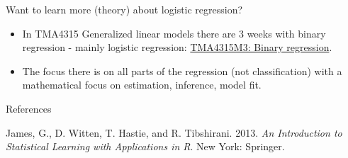 \documentclass[10pt,ignorenonframetext,]{beamer}
\begin{document}
\begin{frame}

\begin{block}{Want to learn more (theory) about logistic regression?}

\begin{itemize}
\item
  In TMA4315 Generalized linear models there are 3 weeks with binary
  regression - mainly logistic regression:
  \href{https://www.math.ntnu.no/emner/TMA4315/2018h/3BinReg.html}{TMA4315M3:
  Binary regression}.
\item
  The focus there is on all parts of the regression (not classification)
  with a mathematical focus on estimation, inference, model fit.
\end{itemize}

\end{block}

\end{frame}

\begin{frame}{References}

\hypertarget{refs}{}
\hypertarget{ref-james.etal}{}
James, G., D. Witten, T. Hastie, and R. Tibshirani. 2013. \emph{An
Introduction to Statistical Learning with Applications in R}. New York:
Springer.

\end{frame}
\end{document}
